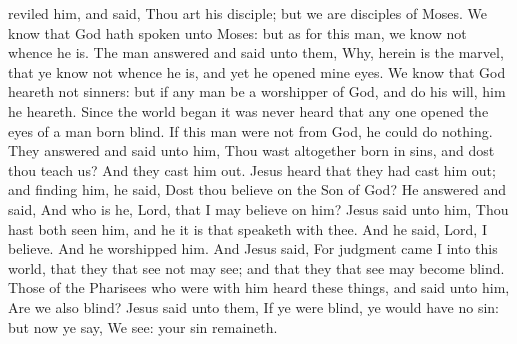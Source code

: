 reviled him, and said, Thou art his disciple; but we are disciples of Moses. We know that God hath spoken unto Moses: but as for this man, we know not whence he is. The man answered and said unto them, Why, herein is the marvel, that ye know not whence he is, and yet he opened mine eyes. We know that God heareth not sinners: but if any man be a worshipper of God, and do his will, him he heareth. Since the world began it was never heard that any one opened the eyes of a man born blind. If this man were not from God, he could do nothing. They answered and said unto him, Thou wast altogether born in sins, and dost thou teach us? And they cast him out.  Jesus heard that they had cast him out; and finding him, he said, Dost thou believe on the Son of God? He answered and said, And who is he, Lord, that I may believe on him? Jesus said unto him, Thou hast both seen him, and he it is that speaketh with thee. And he said, Lord, I believe. And he worshipped him. And Jesus said, For judgment came I into this world, that they that see not may see; and that they that see may become blind. Those of the Pharisees who were with him heard these things, and said unto him, Are we also blind? Jesus said unto them, If ye were blind, ye would have no sin: but now ye say, We see: your sin remaineth. 


